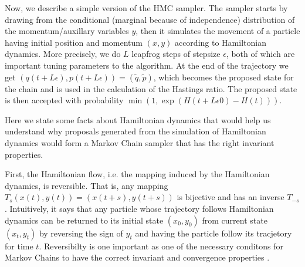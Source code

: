 \documentclass{book}
\begin{document}
\begin{enumerate}
 
Now, we describe a simple version of the HMC sampler.
The sampler starts by drawing from the conditional (marginal because of
independence) distribution of the momentum/auxillary variables $y$, then it simulates the
movement of a particle having initial position and momentum $(x,y)$ according to
Hamiltonian dynamics. More precisely, we do $L$ leapfrog steps of stepsize
$\epsilon$, both of which are important tuning parameters to the algorithm.
At the end of the trajectory we get $(q(t+L \epsilon),p(t+L \epsilon)) =
(\tilde{q}, \tilde{p})$, which becomes the proposed state for the chain and
is used in the calculation of the Hastings ratio. The proposed state is then accepted with probability $\min (1, \exp(H(t+L\epsilon0)-H(t)))$. 

Here we state some facts about Hamiltonian dynamics that would help us
understand why proposals generated from the simulation of Hamiltonian dynamics would
form a Markov Chain sampler that has the right invariant properties. 

First, the Hamiltonian flow, i.e. the mapping induced by the Hamiltonian
dynamics, is reversible. That is, any mapping $T_s(x(t),y(t)) =(x(t+s),y(t+s)) $
is bijective and has an inverse $T_{-s}$. Intuitively, it says that any particle
whose trajectory follows Hamiltonian dynamics can be returned to its initial
state $(x_0,y_0)$ from current state $(x_t,y_t)$ by reversing the sign of $y_t$
and having the particle follow its tracjetory for time $t$. Reversibilty is one
important as one of the necessary conditons for Markov Chains to have the
correct invariant and
convergence properties \cite{robert2013monte}. 


\end{enumerate}
\end{document}
